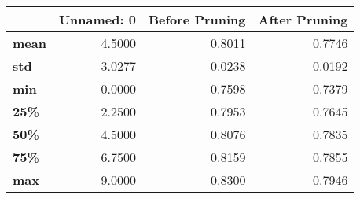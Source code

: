 \begin{tabular}{lrrr}
\toprule
{} &  Unnamed: 0 &  Before Pruning &  After Pruning \\
\midrule
\textbf{mean} &      4.5000 &          0.8011 &         0.7746 \\
\textbf{std } &      3.0277 &          0.0238 &         0.0192 \\
\textbf{min } &      0.0000 &          0.7598 &         0.7379 \\
\textbf{25\% } &      2.2500 &          0.7953 &         0.7645 \\
\textbf{50\% } &      4.5000 &          0.8076 &         0.7835 \\
\textbf{75\% } &      6.7500 &          0.8159 &         0.7855 \\
\textbf{max } &      9.0000 &          0.8300 &         0.7946 \\
\bottomrule
\end{tabular}
